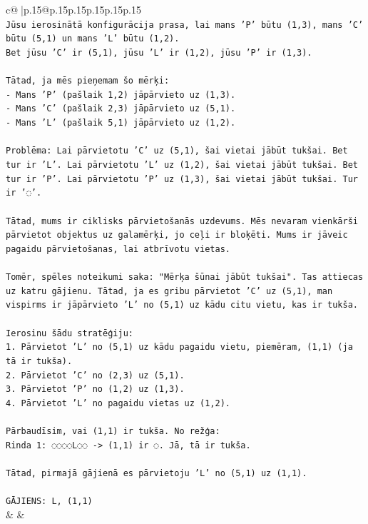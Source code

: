 \documentclass{article}
\begin{document}
{\begin{supertabular}{c@{$\;$}|p{.15\linewidth}@{}p{.15\linewidth}p{.15\linewidth}p{.15\linewidth}p{.15\linewidth}p{.15\linewidth}}
{{{\\ 
\texttt{Jūsu ierosinātā konfigurācija prasa, lai mans 'P' būtu (1,3), mans 'C' būtu (5,1) un mans 'L' būtu (1,2).} \\
\texttt{Bet jūsu 'C' ir (5,1), jūsu 'L' ir (1,2), jūsu 'P' ir (1,3).} \\
\\ 
\texttt{Tātad, ja mēs pieņemam šo mērķi:} \\
\texttt{{-} Mans 'P' (pašlaik 1,2) jāpārvieto uz (1,3).} \\
\texttt{{-} Mans 'C' (pašlaik 2,3) jāpārvieto uz (5,1).} \\
\texttt{{-} Mans 'L' (pašlaik 5,1) jāpārvieto uz (1,2).} \\
\\ 
\texttt{Problēma: Lai pārvietotu 'C' uz (5,1), šai vietai jābūt tukšai. Bet tur ir 'L'. Lai pārvietotu 'L' uz (1,2), šai vietai jābūt tukšai. Bet tur ir 'P'. Lai pārvietotu 'P' uz (1,3), šai vietai jābūt tukšai. Tur ir '◌'.} \\
\\ 
\texttt{Tātad, mums ir ciklisks pārvietošanās uzdevums. Mēs nevaram vienkārši pārvietot objektus uz galamērķi, jo ceļi ir bloķēti. Mums ir jāveic pagaidu pārvietošanas, lai atbrīvotu vietas.} \\
\\ 
\texttt{Tomēr, spēles noteikumi saka: "Mērķa šūnai jābūt tukšai". Tas attiecas uz katru gājienu. Tātad, ja es gribu pārvietot 'C' uz (5,1), man vispirms ir jāpārvieto 'L' no (5,1) uz kādu citu vietu, kas ir tukša.} \\
\\ 
\texttt{Ierosinu šādu stratēģiju:} \\
\texttt{1. Pārvietot 'L' no (5,1) uz kādu pagaidu vietu, piemēram, (1,1) (ja tā ir tukša).} \\
\texttt{2. Pārvietot 'C' no (2,3) uz (5,1).} \\
\texttt{3. Pārvietot 'P' no (1,2) uz (1,3).} \\
\texttt{4. Pārvietot 'L' no pagaidu vietas uz (1,2).} \\
\\ 
\texttt{Pārbaudīsim, vai (1,1) ir tukša. No režģa:} \\
\texttt{Rinda 1: ◌◌◌◌L◌◌ {-}> (1,1) ir ◌. Jā, tā ir tukša.} \\
\\ 
\texttt{Tātad, pirmajā gājienā es pārvietoju 'L' no (5,1) uz (1,1).} \\
\\ 
\texttt{GĀJIENS: L, (1,1)} \\
            }
        }
    }
    & & \\ \\


\end{supertabular}}
\end{document}
